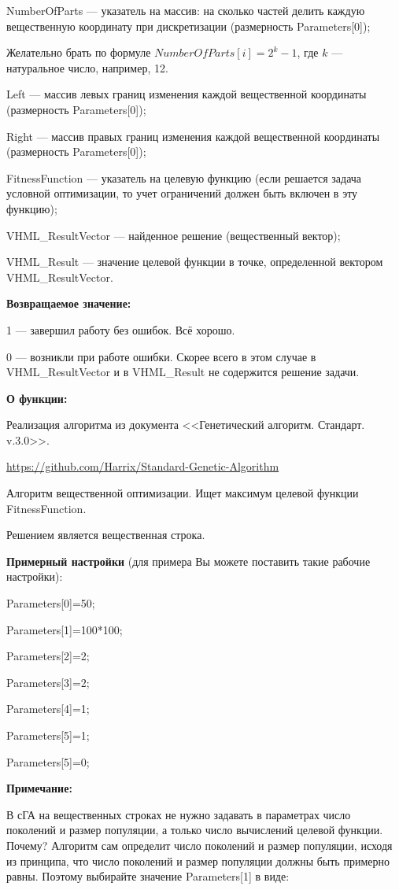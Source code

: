  NumberOfParts --- указатель на массив: на сколько частей делить каждую вещественную координату при дискретизации (размерность Parameters[0]);
 
  Желательно брать по формуле $NumberOfParts[i]=2^k-1$, где $k$ --- натуральное число, например, 12.
  
 Left --- массив левых границ изменения каждой вещественной координаты (размерность Parameters[0]);
 
 Right --- массив правых границ изменения каждой вещественной координаты (размерность Parameters[0]);
 
 FitnessFunction --- указатель на целевую функцию (если решается задача условной оптимизации, то учет ограничений должен быть включен в эту функцию);
 
 VHML\_ResultVector --- найденное решение (вещественный вектор);
 
 VHML\_Result --- значение целевой функции в точке, определенной вектором VHML\_ResultVector.

\textbf{Возвращаемое значение:} 

 1 --- завершил работу без ошибок. Всё хорошо.
 
 0 --- возникли при работе ошибки. Скорее всего в этом случае в VHML\_ResultVector и в VHML\_Result не содержится решение задачи.

\textbf{О функции:}

Реализация алгоритма из документа <<Генетический алгоритм. Стандарт. v.3.0>>.

\href{https://github.com/Harrix/Standard-Genetic-Algorithm}{https://github.com/Harrix/Standard-Genetic-Algorithm}

Алгоритм вещественной оптимизации. Ищет максимум целевой функции FitnessFunction.

Решением является вещественная строка.

\textbf{Примерный настройки} (для примера Вы можете поставить такие рабочие настройки):

 Parameters[0]=50;
 
Parameters[1]=100*100;

Parameters[2]=2;

Parameters[3]=2;

Parameters[4]=1;

Parameters[5]=1;

Parameters[5]=0;


\textbf{Примечание:}

 В сГА на вещественных строках не нужно задавать в параметрах число поколений и размер популяции, а только число вычислений целевой функции. Почему? Алгоритм сам определит число поколений и размер популяции, исходя из принципа, что число поколений и размер популяции должны быть примерно равны. Поэтому выбирайте значение Parameters[1] в виде:

